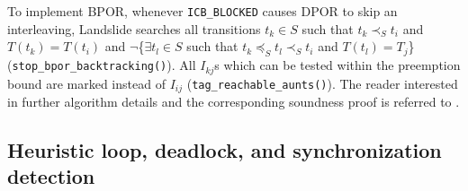 To implement BPOR,
whenever {\tt ICB\_BLOCKED} causes DPOR to skip an interleaving,
Landslide searches all transitions $t_k \in S$
such that $t_k \prec_S t_i$ and $T(t_k) = T(t_i)$ and
$\neg$\{$\exists t_l \in S$ such that $t_k \preceq_S t_l \prec_S t_i$ and $T(t_l) = T_j$\}
({\tt stop\_bpor\_backtracking()}).
All $I_{kj}$s which can be tested within the preemption bound are marked instead of $I_{ij}$
({\tt tag\_reachable\_aunts()}).
The reader interested in further algorithm details and the corresponding soundness proof is referred to \cite{bpor}.


\subsection{Heuristic loop, deadlock, and synchronization detection}

